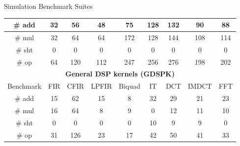 \documentclass{beamer}
\begin{document}
\begin{CJK}{UTF8}{bkai}
\begin{frame}{Simulation Benchmark Suites}
\begin{table}[!ht]
{\begin{tabular}{|c|c|c|c|c|c|c|c|c|}
                        \# add            &  32    &  56    &   48    &    75    &  128   & 132  &   90   &  88   \\ \hline
                        \# mul            &  32    &  64    &   64    &   172    &  128   & 144  &  108   & 114   \\ \hline
                        \# sht            &   0    &   0    &    0    &     0    &    0   &   0  &    0   &   0   \\ \hline
                        \# op             &  64    & 120    &  112    &   247    &  256   & 276  &  198   & 202   \\ \hline
                        \multicolumn{9}{|c|}{\textbf{General DSP kernels (GDSPK)}}                     \\ \hline
                        Benchmark              & FIR    & CFIR   & LPFIR   & Biquad   & IT     & DCT  & IMDCT  & FFT   \\ \hline
                        \# add            & 15     &  62    &   15    &    8     &  32    &  29  &   21   &  23   \\ \hline
                        \# mul            & 16     &  64    &    8    &    9     &   0    &  12  &   11   &  10   \\ \hline
                        \# sht            &  0     &   0    &    0    &    0     &  10    &   9  &    9   &   0   \\ \hline
                        \# op             & 31     & 126    &   23    &   17     &  42    &  50  &   41   &  33   \\ \hline
                    \end{tabular}
                }
            \end{table}
    \end{frame}


\end{CJK}
\end{document}
